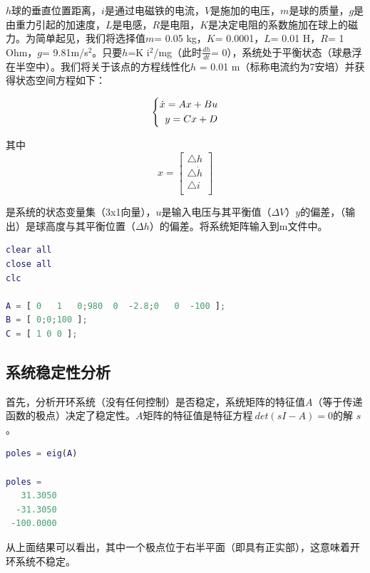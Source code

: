 \documentclass[UTF8]{ctexart}
\begin{document}
\par  $ h $球的垂直位置距离，$ i $是通过电磁铁的电流，$ V $是施加的电压，$ m $是球的质量，$ g $是由重力引起的加速度，$ L $是电感，$ R $是电阻，$ K $是决定电阻的系数施加在球上的磁力。为简单起见，我们将选择值$ m $= 0.05 kg，$ K $= 0.0001，$ L $= 0.01 H，$ R $= 1 Ohm，$ g $= 9.81m/s$^{2}$。只要$ h $=K i$^{2}$/mg（此时$\frac {dh}{dt}$= 0），系统处于平衡状态（球悬浮在半空中）。我们将关于该点的方程线性化$ h $ = 0.01 m（标称电流约为7安培）并获得状态空间方程如下：
\par \begin{equation}
   \left  \{\begin{aligned}
      \dot x=Ax+Bu    \\
      y=Cx+D     \\
        \end{aligned}\\
    \right.
 \end{equation}
\par 其中
\begin{equation}
    x=\begin{bmatrix}
    \triangle h\\
    \triangle \dot h\\
    \triangle i\\
    \end{bmatrix}
\end{equation}
\par 是系统的状态变量集（3x1向量），$ u $是输入电压与其平衡值（$ \Delta V $）$ y $的偏差，（输出）是球高度与其平衡位置（$ \Delta h $）的偏差。将系统矩阵输入到m文件中。
\par  \begin{lstlisting}[language=matlab,escapeinside=``]
clear all
close all
clc

A = [ 0   1   0;980  0  -2.8;0   0  -100 ];
B = [ 0;0;100 ];
C = [ 1 0 0 ];
\end{lstlisting}

\subsection{ 系统稳定性分析}
\par 首先，分析开环系统（没有任何控制）是否稳定，系统矩阵的特征值$ A $（等于传递函数的极点）决定了稳定性。$ A $矩阵的特征值是特征方程$ \ det(sI  -  A)= 0 $的解 $ s $。
\par  \begin{lstlisting}[language=matlab,escapeinside=``]
poles = eig(A)

poles =
   31.3050
  -31.3050
 -100.0000
\end{lstlisting}
\par 从上面结果可以看出，其中一个极点位于右半平面（即具有正实部），这意味着开环系统不稳定。
\end{document}
